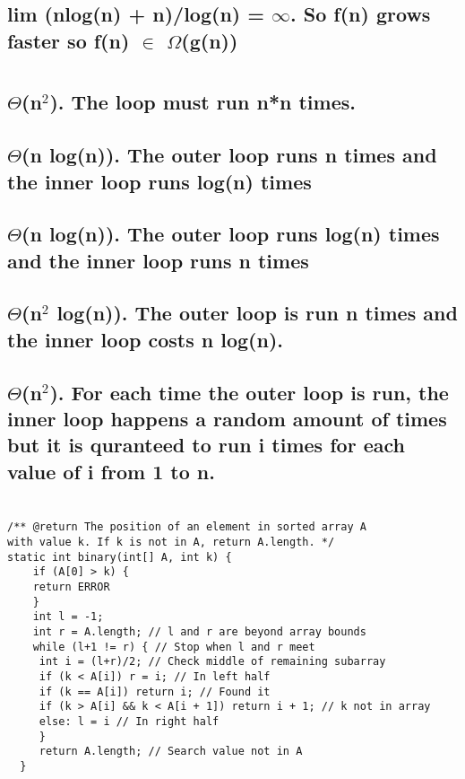 \documentclass[11pt]{article}
\begin{document}
\subsection{lim (nlog(n) + n)/log(n) = \(\infty\). So f(n) grows faster so f(n) \(\in\) \(\Omega\)(g(n))}
\label{sec:org722b7bb}
\section{}
\label{sec:org2783b70}
\subsection{\(\Theta\)(n\(^{\text{2}}\)). The loop must run n*n times.}
\label{sec:org0ec48e9}
\subsection{\(\Theta\)(n log(n)). The outer loop runs n times and the inner loop runs log(n) times}
\label{sec:orga9a9038}
\subsection{\(\Theta\)(n log(n)). The outer loop runs log(n) times and the inner loop runs n times}
\label{sec:org3e67350}
\subsection{\(\Theta\)(n\(^{\text{2}}\) log(n)). The outer loop is run n times and the inner loop costs n log(n).}
\label{sec:org72da379}
\subsection{\(\Theta\)(n\(^{\text{2}}\)). For each time the outer loop is run, the inner loop happens a random amount of times but it is quranteed to run i times for each value of i from 1 to n.}
\label{sec:orgb00c463}
\section{}
\label{sec:org11551c6}
\begin{verbatim}
/** @return The position of an element in sorted array A
with value k. If k is not in A, return A.length. */
static int binary(int[] A, int k) {
    if (A[0] > k) {
	return ERROR
    }
    int l = -1;
    int r = A.length; // l and r are beyond array bounds
    while (l+1 != r) { // Stop when l and r meet
	 int i = (l+r)/2; // Check middle of remaining subarray
	 if (k < A[i]) r = i; // In left half
	 if (k == A[i]) return i; // Found it
	 if (k > A[i] && k < A[i + 1]) return i + 1; // k not in array
	 else: l = i // In right half
     }
     return A.length; // Search value not in A
  }
\end{verbatim}
\end{document}
